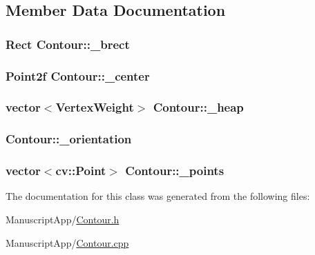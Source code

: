 \subsection{Member Data Documentation}
\hypertarget{class_contour_aefe73b0c7479e0a6bca7c76e5cc4aa6d}{
\subsubsection[{\+\_\+brect}]{\setlength{\rightskip}{0pt plus 5cm}Rect Contour\+::\+\_\+brect\hspace{0.3cm}{\ttfamily [protected]}}}\label{class_contour_aefe73b0c7479e0a6bca7c76e5cc4aa6d}
\hypertarget{class_contour_a60351d0013e44e0ea12b8c2f227b2d74}{
\subsubsection[{\+\_\+center}]{\setlength{\rightskip}{0pt plus 5cm}Point2f Contour\+::\+\_\+center\hspace{0.3cm}{\ttfamily [protected]}}}\label{class_contour_a60351d0013e44e0ea12b8c2f227b2d74}
\hypertarget{class_contour_a7a26f7919fa25f04975ab3949152437b}{
\subsubsection[{\+\_\+heap}]{\setlength{\rightskip}{0pt plus 5cm}vector$<${\bf Vertex\+Weight}$>$ Contour\+::\+\_\+heap\hspace{0.3cm}{\ttfamily [protected]}}}\label{class_contour_a7a26f7919fa25f04975ab3949152437b}
\hypertarget{class_contour_a946768dfb1a6b340165360db2bf279db}{
\subsubsection[{\+\_\+orientation}]{ Contour\+::\+\_\+orientation\hspace{0.3cm}{\ttfamily [protected]}}}\label{class_contour_a946768dfb1a6b340165360db2bf279db}
\hypertarget{class_contour_a5fe5723655cd3e3a1e40a433565ed9f7}{
\subsubsection[{\+\_\+points}]{\setlength{\rightskip}{0pt plus 5cm}vector$<$cv\+::\+Point$>$ Contour\+::\+\_\+points\hspace{0.3cm}{\ttfamily [protected]}}}\label{class_contour_a5fe5723655cd3e3a1e40a433565ed9f7}


The documentation for this class was generated from the following files\+:\begin{DoxyCompactItemize}
\item 
Manuscript\+App/\hyperlink{_contour_8h}{Contour.\+h}\item 
Manuscript\+App/\hyperlink{_contour_8cpp}{Contour.\+cpp}\end{DoxyCompactItemize}
